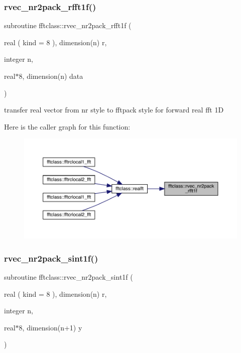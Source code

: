 \subsubsection{\texorpdfstring{rvec\_nr2pack\_rfft1f()}{rvec\_nr2pack\_rfft1f()}}
{\footnotesize\ttfamily subroutine fftclass\+::rvec\+\_\+nr2pack\+\_\+rfft1f (\begin{DoxyParamCaption}\item[{real ( kind = 8 ), dimension(n)}]{r,  }\item[{integer}]{n,  }\item[{real$\ast$8, dimension(n)}]{data }\end{DoxyParamCaption})}



transfer real vector from nr style to fftpack style for forward real fft 1D 

Here is the caller graph for this function\+:\nopagebreak
\begin{figure}[H]
\begin{center}
\leavevmode
\includegraphics[width=350pt]{namespacefftclass_ac09ed442a8bb7846768adbe2d5c798c6_icgraph}
\end{center}
\end{figure}
\mbox{\label{namespacefftclass_ae1f9bdd4e66db530852187dff115ae36}} 
\subsubsection{\texorpdfstring{rvec\_nr2pack\_sint1f()}{rvec\_nr2pack\_sint1f()}}
{\footnotesize\ttfamily subroutine fftclass\+::rvec\+\_\+nr2pack\+\_\+sint1f (\begin{DoxyParamCaption}\item[{real ( kind = 8 ), dimension(n)}]{r,  }\item[{integer}]{n,  }\item[{real$\ast$8, dimension(n+1)}]{y }\end{DoxyParamCaption})}



